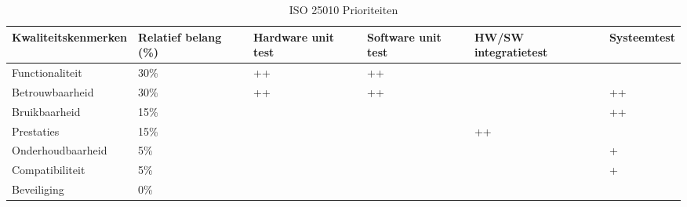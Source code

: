 \documentclass[a4paper]{report}
\newcommand{\turtleguard}{\mbox{TurtleGuard\texttrademark}\xspace}
\begin{document}
\begin{table}[h]
  \centering
  \begin{tabularx}{\textwidth}{|l|X|X|X|X|X|}
    \hline
    \textbf{Kwaliteitskenmerken} & \textbf{Relatief \newline belang \newline (\%)} & \textbf{Hardware \newline unit test} & \textbf{Software \newline unit test} & \textbf{HW/SW \newline integratietest} & \textbf{Systeemtest} \\
    \hline 
    Functionaliteit & 30\% & ++ & ++ &  &  \\ 
    \hline
    Betrouwbaarheid & 30\% & ++ & ++ &  & ++ \\ 
    \hline
    Bruikbaarheid & 15\% &  &  &  & ++ \\ 
    \hline
    Prestaties & 15\% &  &  & ++ &  \\ 
    \hline
    Onderhoudbaarheid & 5\% &  &  &  & + \\ 
    \hline
    Compatibiliteit & 5\% &  &  &  & + \\ 
    \hline
    Beveiliging & 0\% &  &  &  &  \\ 
    \hline
  \end{tabularx}
  \caption{ISO 25010 Prioriteiten}
  \label{tab:25010_priorities}
\end{table}


\end{document}
